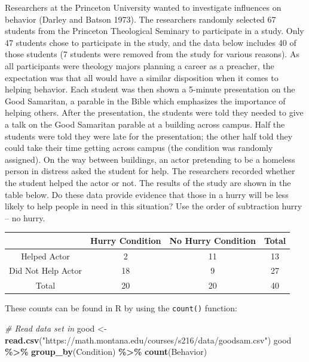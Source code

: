 \documentclass[
]{report}
\newenvironment{Shaded}{\begin{snugshade}}{\end{snugshade}}
\newcommand{\CommentTok}[1]{\textcolor[rgb]{0.56,0.35,0.01}{\textit{#1}}}
\newcommand{\FunctionTok}[1]{\textcolor[rgb]{0.13,0.29,0.53}{\textbf{#1}}}
\newcommand{\NormalTok}[1]{#1}
\newcommand{\OtherTok}[1]{\textcolor[rgb]{0.56,0.35,0.01}{#1}}
\newcommand{\SpecialCharTok}[1]{\textcolor[rgb]{0.81,0.36,0.00}{\textbf{#1}}}
\newcommand{\StringTok}[1]{\textcolor[rgb]{0.31,0.60,0.02}{#1}}
\begin{document}
Researchers at the Princeton University wanted to investigate influences on behavior (Darley and Batson 1973). The researchers randomly selected 67 students from the Princeton Theological Seminary to participate in a study. Only 47 students chose to participate in the study, and the data below includes 40 of those students (7 students were removed from the study for various reasons). As all participants were theology majors planning a career as a preacher, the expectation was that all would have a similar disposition when it comes to helping behavior. Each student was then shown a 5-minute presentation on the Good Samaritan, a parable in the Bible which emphasizes the importance of helping others. After the presentation, the students were told they needed to give a talk on the Good Samaritan parable at a building across campus. Half the students were told they were late for the presentation; the other half told they could take their time getting across campus (the condition was randomly assigned). On the way between buildings, an actor pretending to be a homeless person in distress asked the student for help. The researchers recorded whether the student helped the actor or not. The results of the study are shown in the table below. Do these data provide evidence that those in a hurry will be less likely to help people in need in this situation? Use the order of subtraction hurry -- no hurry.

\begin{center}
\begin{tabular}{|c|c|c|c|}\hline
& Hurry Condition & No Hurry Condition & Total \\ \hline
Helped Actor & 2 & 11 & 13 \\ \hline
Did Not Help Actor & 18 & 9 & 27 \\ \hline
Total & 20 & 20 & 40 \\ \hline
\end{tabular}
\end{center}

These counts can be found in R by using the \texttt{count()} function:

\begin{Shaded}
\begin{Highlighting}[]
\CommentTok{\# Read data set in}
\NormalTok{good }\OtherTok{\textless{}{-}} \FunctionTok{read.csv}\NormalTok{(}\StringTok{"https://math.montana.edu/courses/s216/data/goodsam.csv"}\NormalTok{) }
\NormalTok{good }\SpecialCharTok{\%\textgreater{}\%} \FunctionTok{group\_by}\NormalTok{(Condition) }\SpecialCharTok{\%\textgreater{}\%} \FunctionTok{count}\NormalTok{(Behavior)}
\end{Highlighting}
\end{Shaded}
\end{document}
